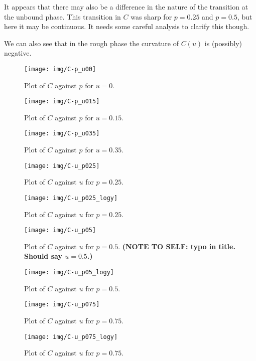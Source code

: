 \documentclass[a4paper,10pt]{article}
\begin{document}
It appears that there may also be a difference in the nature of the transition at the unbound phase. This transition in $C$ was sharp for $p=0.25$ and $p=0.5$, but here it may be continuous. It needs some careful analysis to clarify this though.

We can also see that in the rough phase the curvature of $C(u)$ is (possibly) negative.


\begin{figure}
 \centering
 \texttt{[image: img/C-p\_u00]}
 \caption{Plot of $C$ against $p$ for $u=0$.}
 \label{fig:C-p_u00}
\end{figure}
\begin{figure}
 \centering
 \texttt{[image: img/C-p\_u015]}
 \caption{Plot of $C$ against $p$ for $u=0.15$.}
 \label{fig:C-p_u015}
\end{figure}
\begin{figure}
 \centering
 \texttt{[image: img/C-p\_u035]}
 \caption{Plot of $C$ against $p$ for $u=0.35$.}
 \label{fig:C-p_u035}
\end{figure}

\begin{figure}
 \centering
 \texttt{[image: img/C-u\_p025]}
 \caption{Plot of $C$ against $u$ for $p=0.25$.}
 \label{fig:C-u_p025}
\end{figure}
\begin{figure}
 \centering
 \texttt{[image: img/C-u\_p025\_logy]}
 \caption{Plot of $C$ against $u$ for $p=0.25$.}
 \label{fig:C-u_p025_logy}
\end{figure}
\begin{figure}
 \centering
 \texttt{[image: img/C-u\_p05]}
 \caption{Plot of $C$ against $u$ for $p=0.5$. {\bf (NOTE TO SELF: typo in title. Should say $u=0.5$.)}}
 \label{fig:C-u_p05}
\end{figure}
\begin{figure}
 \centering
 \texttt{[image: img/C-u\_p05\_logy]}
 \caption{Plot of $C$ against $u$ for $p=0.5$.}
 \label{fig:C-u_p05_logy}
\end{figure}
\begin{figure}
 \centering
 \texttt{[image: img/C-u\_p075]}
 \caption{Plot of $C$ against $u$ for $p=0.75$.}
 \label{fig:C-u_p075}
\end{figure}
\begin{figure}
 \centering
 \texttt{[image: img/C-u\_p075\_logy]}
 \caption{Plot of $C$ against $u$ for $p=0.75$.}
 \caption{}
 \label{fig:C-u_p075_logy}
\end{figure}
\end{document}
